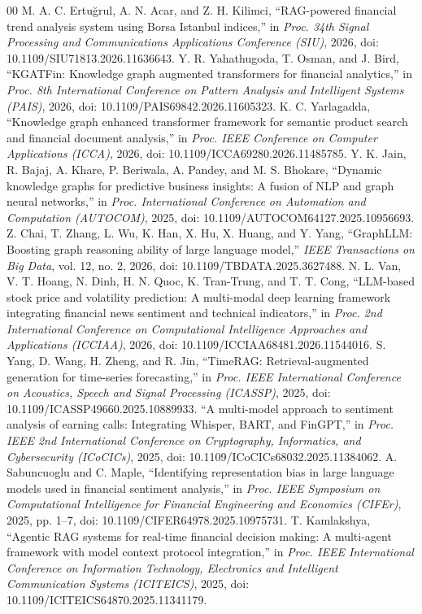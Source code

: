 \documentclass[conference]{IEEEtran}
\begin{document}
\begin{thebibliography}{00}
 M. A. C. Ertu\u{g}rul, A. N. Acar, and Z. H. Kilimci, ``RAG-powered financial trend analysis system using Borsa Istanbul indices,'' in \textit{Proc. 34th Signal Processing and Communications Applications Conference (SIU)}, 2026, doi: 10.1109/SIU71813.2026.11636643.
 Y. R. Yahathugoda, T. Osman, and J. Bird, ``KGATFin: Knowledge graph augmented transformers for financial analytics,'' in \textit{Proc. 8th International Conference on Pattern Analysis and Intelligent Systems (PAIS)}, 2026, doi: 10.1109/PAIS69842.2026.11605323.
 K. C. Yarlagadda, ``Knowledge graph enhanced transformer framework for semantic product search and financial document analysis,'' in \textit{Proc. IEEE Conference on Computer Applications (ICCA)}, 2026, doi: 10.1109/ICCA69280.2026.11485785.
 Y. K. Jain, R. Bajaj, A. Khare, P. Beriwala, A. Pandey, and M. S. Bhokare, ``Dynamic knowledge graphs for predictive business insights: A fusion of NLP and graph neural networks,'' in \textit{Proc. International Conference on Automation and Computation (AUTOCOM)}, 2025, doi: 10.1109/AUTOCOM64127.2025.10956693.
 Z. Chai, T. Zhang, L. Wu, K. Han, X. Hu, X. Huang, and Y. Yang, ``GraphLLM: Boosting graph reasoning ability of large language model,'' \textit{IEEE Transactions on Big Data}, vol. 12, no. 2, 2026, doi: 10.1109/TBDATA.2025.3627488.
 N. L. Van, V. T. Hoang, N. Dinh, H. N. Quoc, K. Tran-Trung, and T. T. Cong, ``LLM-based stock price and volatility prediction: A multi-modal deep learning framework integrating financial news sentiment and technical indicators,'' in \textit{Proc. 2nd International Conference on Computational Intelligence Approaches and Applications (ICCIAA)}, 2026, doi: 10.1109/ICCIAA68481.2026.11544016.
 S. Yang, D. Wang, H. Zheng, and R. Jin, ``TimeRAG: Retrieval-augmented generation for time-series forecasting,'' in \textit{Proc. IEEE International Conference on Acoustics, Speech and Signal Processing (ICASSP)}, 2025, doi: 10.1109/ICASSP49660.2025.10889933.
 ``A multi-model approach to sentiment analysis of earning calls: Integrating Whisper, BART, and FinGPT,'' in \textit{Proc. IEEE 2nd International Conference on Cryptography, Informatics, and Cybersecurity (ICoCICs)}, 2025, doi: 10.1109/ICoCICs68032.2025.11384062.
 A. Sabuncuoglu and C. Maple, ``Identifying representation bias in large language models used in financial sentiment analysis,'' in \textit{Proc. IEEE Symposium on Computational Intelligence for Financial Engineering and Economics (CIFEr)}, 2025, pp. 1--7, doi: 10.1109/CIFER64978.2025.10975731.
 T. Kamlakshya, ``Agentic RAG systems for real-time financial decision making: A multi-agent framework with model context protocol integration,'' in \textit{Proc. IEEE International Conference on Information Technology, Electronics and Intelligent Communication Systems (ICITEICS)}, 2025, doi: 10.1109/ICITEICS64870.2025.11341179.
\end{thebibliography}
\end{document}
